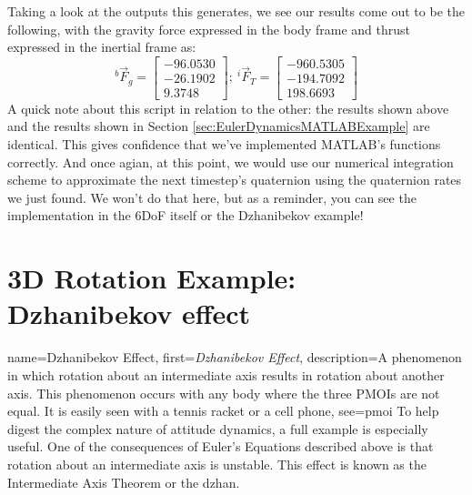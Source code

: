 \documentclass[12pt]{report}
\begin{document}
\lstset{style=mystyle}

\label{Quat Dynamics Listing}

Taking a look at the outputs this generates, we see our results come out to be the following, with the gravity force expressed in the body frame and thrust expressed in the inertial frame as:
\begin{equation}
    ^b\vec{F}_{g}=\begin{bmatrix}
        -96.0530\\-26.1902\\9.3748
    \end{bmatrix};\ ^i\vec{F}_{T}=\begin{bmatrix}
        -960.5305\\-194.7092\\198.6693
    \end{bmatrix}
\end{equation}
A quick note about this script in relation to the other: the results shown above and the results shown in Section \ref{sec:EulerDynamicsMATLABExample} are identical. This gives confidence that we've implemented MATLAB's functions correctly. And once agian, at this point, we would use our numerical integration scheme to approximate the next timestep's quaternion using the quaternion rates we just found. We won't do that here, but as a reminder, you can see the implementation in the 6DoF itself or the Dzhanibekov example! 

\section{3D Rotation Example: Dzhanibekov effect}\label{sec:Dzhan}

{
    name={Dzhanibekov Effect},
    first=\textit{Dzhanibekov Effect},
    description={A phenomenon in which rotation about an intermediate axis results in rotation about another axis. This phenomenon occurs with any body where the three PMOIs are not equal. It is easily seen with a tennis racket or a cell phone},
    see={pmoi}
}
To help digest the complex nature of attitude dynamics, a full example is especially useful. One of the consequences of Euler's Equations described %
above is that rotation about an intermediate axis is unstable. This effect is known as the Intermediate Axis Theorem or the \gls{dzhan}.
\end{document}
